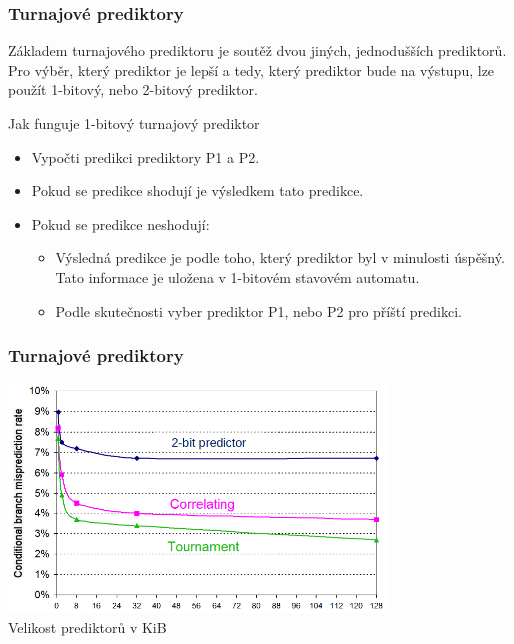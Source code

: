 \documentclass{beamer}
\begin{document}
\begin{frame}
\frametitle{Turnajové prediktory}

Základem turnajového prediktoru je soutěž dvou jiných, jednodušších prediktorů. Pro výběr, který prediktor je lepší a tedy, který prediktor bude na výstupu, lze použít 1-bitový, nebo 2-bitový prediktor. 

\bigskip
Jak funguje 1-bitový turnajový prediktor
\begin{itemize}
\item Vypočti predikci prediktory P1 a P2.
\item Pokud se predikce shodují je výsledkem tato predikce.
\item Pokud se predikce neshodují:
\begin{itemize}
\item Výsledná predikce je podle toho, který prediktor byl v minulosti úspěšný. Tato informace je uložena v 1-bitovém stavovém automatu. 
\item Podle skutečnosti vyber prediktor P1, nebo P2 pro příští predikci.
\end{itemize}
\end{itemize}
\end{frame}

\begin{frame}
\frametitle{Turnajové prediktory}

\begin{center}
\includegraphics[width=0.75\textwidth]{fig/tournament.png}\\
\small Velikost prediktorů v KiB
\end{center}
\end{frame}
\end{document}

